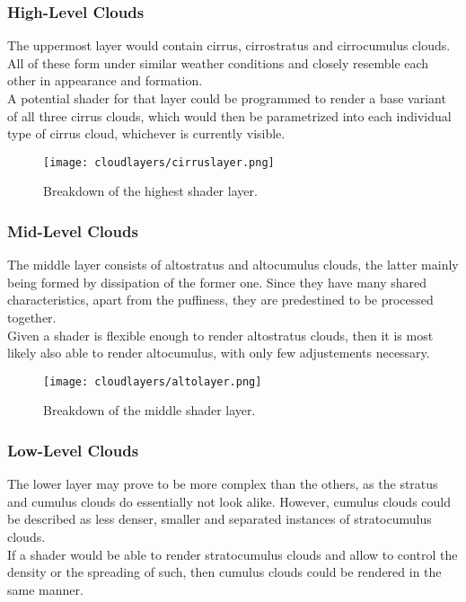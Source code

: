 \pagebreak

\subsubsection{High-Level Clouds}
The uppermost layer would contain cirrus, cirrostratus and cirrocumulus clouds.
All of these form under similar weather conditions and closely resemble each other in appearance and formation.
\\
A potential \gls{shader} for that layer could be programmed to render a base variant of all three cirrus clouds, which would then be parametrized into each individual type of cirrus cloud, whichever is currently visible.

\begin{figure}[H]
    \texttt{[image: cloudlayers/cirruslayer.png]}
    \caption{Breakdown of the highest shader layer.}
    \label{img:cloudlayer:cirrus}
\end{figure}

\subsubsection{Mid-Level Clouds}
The middle layer consists of altostratus and altocumulus clouds, the latter mainly being formed by dissipation of the former one.
Since they have many shared characteristics, apart from the puffiness, they are predestined to be processed together.
\\
Given a \gls{shader} is flexible enough to render altostratus clouds, then it is most likely also able to render altocumulus, with only few adjustements necessary.

\begin{figure}[H]
    \texttt{[image: cloudlayers/altolayer.png]}
    \caption{Breakdown of the middle shader layer.}
    \label{img:cloudlayer:alto}
\end{figure}

\pagebreak

\subsubsection{Low-Level Clouds}
The lower layer may prove to be more complex than the others, as the stratus and cumulus clouds do essentially not look alike.
However, cumulus clouds could be described as less denser, smaller and separated instances of stratocumulus clouds.
\\
If a \gls{shader} would be able to render stratocumulus clouds and allow to control the density or the spreading of such, then cumulus clouds could be rendered in the same manner.

